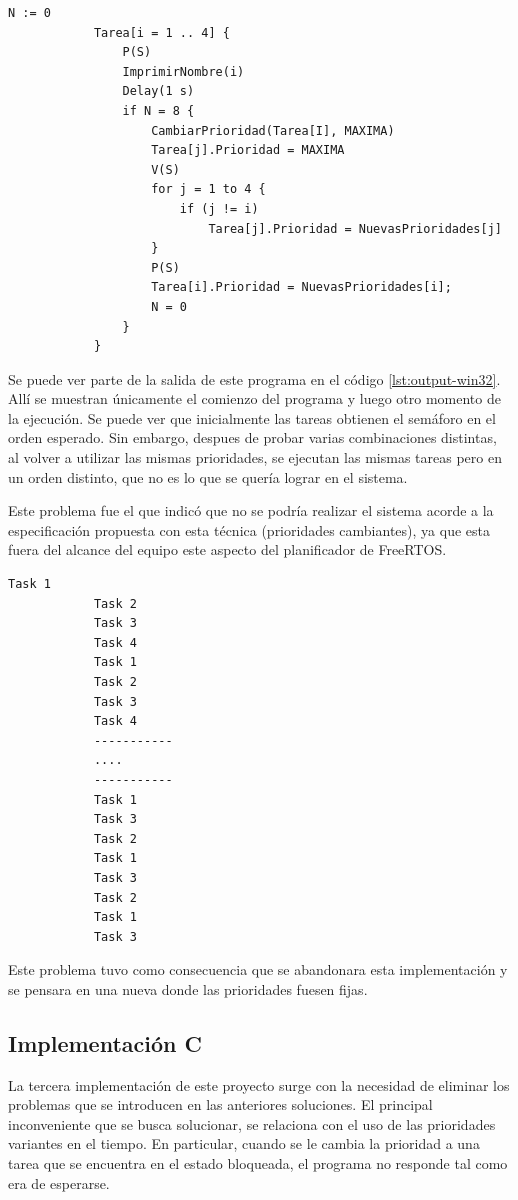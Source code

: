		\begin{lstlisting}[float, label=lst:win32, caption=Pseudocódigo del programa escrito para FreeRTOS-Win32.]
			N := 0
			Tarea[i = 1 .. 4] {
				P(S)
				ImprimirNombre(i)
				Delay(1 s)
				if N = 8 {
					CambiarPrioridad(Tarea[I], MAXIMA)
					Tarea[j].Prioridad = MAXIMA
					V(S)
					for j = 1 to 4 {
						if (j != i)
							Tarea[j].Prioridad = NuevasPrioridades[j]
					}
					P(S)
					Tarea[i].Prioridad = NuevasPrioridades[i];
					N = 0
				}
			}
		\end{lstlisting}

		Se puede ver parte de la salida de este programa en el código \ref{lst:output-win32}.
		Allí se muestran únicamente el comienzo del programa y luego otro momento de la ejecución.
		Se puede ver que inicialmente las tareas obtienen el semáforo en el orden esperado.
		Sin embargo, despues de probar varias combinaciones distintas, al volver a utilizar las mismas prioridades, se ejecutan las mismas tareas pero en un orden distinto, que no es lo que se quería lograr en el sistema.

		Este problema fue el que indicó que no se podría realizar el sistema acorde a la especificación propuesta con esta técnica (prioridades cambiantes), ya que esta fuera del alcance del equipo este aspecto del planificador de FreeRTOS.

		\begin{lstlisting}[float, label=lst:output-win32, caption=Salida del programa de prueba escrito para Win32.]
			Task 1
			Task 2
			Task 3
			Task 4
			Task 1
			Task 2
			Task 3
			Task 4
			-----------
			....
			-----------
			Task 1
			Task 3
			Task 2
			Task 1
			Task 3
			Task 2
			Task 1
			Task 3
		\end{lstlisting}

		Este problema tuvo como consecuencia que se abandonara esta implementación y se pensara en una nueva donde las prioridades fuesen fijas.



	\subsection{Implementación C}

		La tercera implementación de este proyecto surge con la necesidad de eliminar los problemas que se introducen en las anteriores soluciones.
		El principal inconveniente que se busca solucionar, se relaciona con el uso de las prioridades variantes en el tiempo.
		En particular, cuando se le cambia la prioridad a una tarea que se encuentra en el estado bloqueada, el programa no responde tal como era de esperarse.

